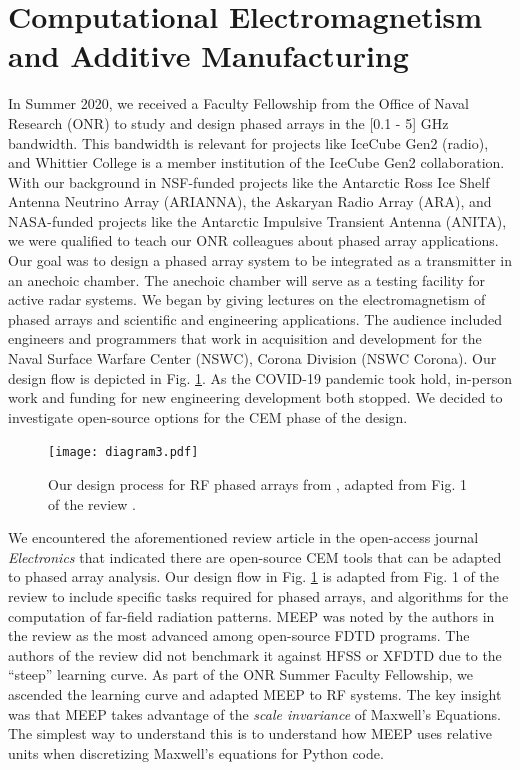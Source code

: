 \documentclass[../../main.tex]{subfiles}
\begin{document}
\section{Computational Electromagnetism and Additive Manufacturing}
\label{sec:cem}

In Summer 2020, we received a Faculty Fellowship from the Office of Naval Research (ONR) to study and design phased arrays in the [0.1 - 5] GHz bandwidth.  This bandwidth is relevant for projects like IceCube Gen2 (radio), and Whittier College is a member institution of the IceCube Gen2 collaboration.  With our background in NSF-funded projects like the Antarctic Ross Ice Shelf Antenna Neutrino Array (ARIANNA), the Askaryan Radio Array (ARA), and NASA-funded projects like the Antarctic Impulsive Transient Antenna (ANITA), we were qualified to teach our ONR colleagues about phased array applications.  Our goal was to design a phased array system to be integrated as a transmitter in an anechoic chamber.  The anechoic chamber will serve as a testing facility for active radar systems.  We began by giving lectures on the electromagnetism of phased arrays and scientific and engineering applications.  The audience included engineers and programmers that work in acquisition and development for the Naval Surface Warfare Center (NSWC), Corona Division (NSWC Corona).  Our design flow is depicted in Fig. \ref{fig:design}.  As the COVID-19 pandemic took hold, in-person work and funding for new engineering development both stopped.  We decided to investigate open-source options for the CEM phase of the design. \\ \vspace{2.5mm}

\begin{figure}
\centering
\texttt{[image: diagram3.pdf]}
\caption{\label{fig:design}  Our design process for RF phased arrays from \cite{electronics10040415}, adapted from Fig. 1 of the review \cite{10.3390/electronics8121506}.}
\end{figure}

We encountered the aforementioned review article in the open-access journal \textit{Electronics} that indicated there are open-source CEM tools that can be adapted to phased array analysis.  Our design flow in Fig. \ref{fig:design} is adapted from Fig. 1 of the review to include specific tasks required for phased arrays, and algorithms for the computation of far-field radiation patterns.  MEEP was noted by the authors in the review as the most advanced among open-source FDTD programs.  The authors of the review did not benchmark it against HFSS or XFDTD due to the ``steep'' learning curve.  As part of the ONR Summer Faculty Fellowship, we ascended the learning curve and adapted MEEP to RF systems.  The key insight was that MEEP takes advantage of the \textit{scale invariance} of Maxwell's Equations.  The simplest way to understand this is to understand how MEEP uses relative units when discretizing Maxwell's equations for Python code. \\ \vspace{2.5mm}
\end{document}
